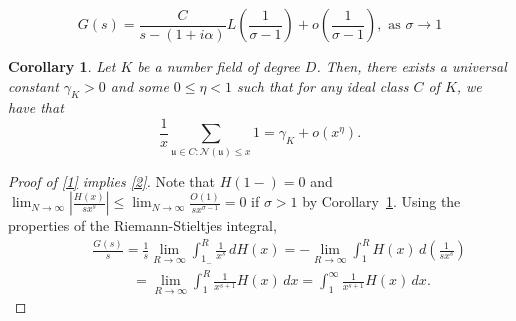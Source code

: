 \documentclass[10pt,a4paper]{amsart}
\newtheorem{corollary}{Corollary}
\newcommand{\NN}{{\mathcal N}}
\newcommand{\mf}{\mathfrak}
\begin{document}
  \begin{equation}\label{2}
     G(s)=\frac{C}{s-(1+i\alpha)}L\left(\frac{1}{\sigma-1}\right)+o\left(\frac{1}{\sigma-1}\right), \text{ as }\sigma\to 1
 \end{equation}

\begin{corollary}\label{lem: bounds for number of ideals of norm at most x}
Let $K$ be a number field of degree $D$. Then, there exists a universal constant $\gamma_K>0$ and some $0 \leq \eta<1$ %
such that for any ideal class $C$ of $K$, we have that %
\[
\frac{1}{x}\sum_{\mf u\in C\colon \NN(\mf u) \leq x}1 = \gamma_K+o(x^{\eta}).
\]
\end{corollary}

  \begin{proof}[Proof of \eqref{1} implies \eqref{2}] 
 Note that $H(1-)=0$ and 
    $\lim_{N\to\infty}\left| \frac{H(x)}{sx^{s}}\right|\leq \lim_{N\to\infty}\frac{O(1)}{sx^{\sigma-1}}=0$ if $\sigma>1$ by Corollary~\ref{lem: bounds for number of ideals of norm at most x}.    
    Using the properties of the Riemann-Stieltjes integral,
    \begin{equation}\label{early}
    \begin{split}
    &\qquad \frac{G(s)}{s}=\frac{1}{s}\lim_{R\to\infty}\int_{1_-}^R\frac{1}{x^{s}}\,dH(x)=-\lim_{R\to\infty}\int_{1}^R H(x)\,d\left(\frac{1}{sx^{s}}\right)
    \\&\qquad\;\;\;\quad\quad=\lim_{R\to\infty}\int_1^R\frac{1}{x^{s+1}}H(x)\,dx = \int_1^{\infty} \frac{1}{x^{s+1}}H(x)\,dx.
    \end{split}
 \end{equation}
   

\end{proof}
\end{document}
